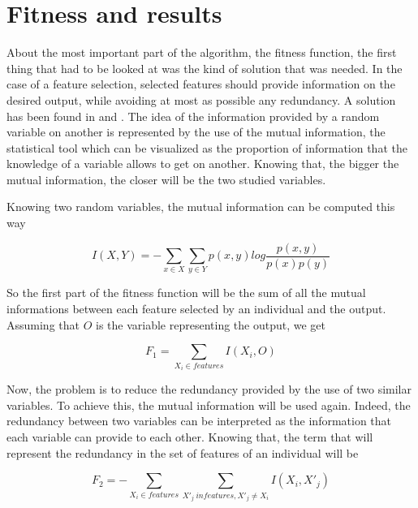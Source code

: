 \documentclass{report}
\begin{document}
	\section{Fitness and results}
	
	About the most important part of the algorithm, the fitness function, the first thing that had to be looked at was the kind of solution that was needed. In the case of a feature selection, selected features should provide information on the desired output, while avoiding at most as possible any redundancy. A solution has been found in \cite{huang2007hybrid} and \cite{chahkandifeature}. The idea of the information provided by a random variable on another is represented by the use of the mutual information, the statistical tool which can be visualized as the proportion of information that the knowledge of a variable allows to get on another. Knowing that, the bigger the mutual information, the closer will be the two studied variables.
	
	Knowing two random variables, the mutual information can be computed this way
	
	\vspace{0.3cm}
	\begin{equation}
	I(X,Y) =- \sum_{x\in X}^{}\sum_{y\in Y}^{} p(x,y)log\frac{p(x,y)}{p(x)p(y)}
	\end{equation}
	\vspace{0.3cm}
	
	So the first part of the fitness function will be the sum of all the mutual informations between each feature selected by an individual and the output. Assuming that $O$ is the variable representing the output, we get 
	
	\vspace{0.3cm}
	\begin{equation}
	F_1 = \sum_{X_i \in features} I(X_i,O)
	\end{equation}
	\vspace{0.3cm}
	
	Now, the problem is to reduce the redundancy provided by the use of two similar variables. To achieve this, the mutual information will be used again. Indeed, the redundancy between two variables can be interpreted as the information that each variable can provide to each other. Knowing that, the term that will represent the redundancy in the set of features of an individual will be
	
	\vspace{0.3cm}
	\begin{equation}
	F_2 = -\sum_{X_i \in features} \sum_{X'_j \ in features, X'_j \neq X_i} I(X_i,X'_j)
	\end{equation}
	\vspace{0.3cm}
	
\end{document}
